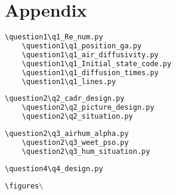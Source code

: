 \documentclass{apmcmthesis}
\begin{document}
\newpage

\section{Appendix}
\begin{lstlisting}[language=python,caption={The code path for question1 in Python}]
	\question1\q1_Re_num.py
	\question1\q1_position_ga.py
	\question1\q1_air_diffusivity.py
	\question1\q1_Initial_state_code.py
	\question1\q1_diffusion_times.py
	\question1\q1_lines.py
 \end{lstlisting}
\begin{lstlisting}[language=python,caption={The code path for question2 in Python}]
	\question2\q2_cadr_design.py
	\question2\q2_picture_design.py
	\question2\q2_situation.py
 \end{lstlisting}
\begin{lstlisting}[language=python,caption={The code path for question3 in Python}]
	\question2\q3_airhum_alpha.py
	\question2\q3_weet_pso.py
	\question2\q3_hum_situation.py
\end{lstlisting}
\begin{lstlisting}[language=python,caption={The code path for question4 in Python}]
	\question4\q4_design.py
\end{lstlisting}
\begin{lstlisting}[language=python,caption={The original image path}]
	\figures\
\end{lstlisting}
\end{document}
